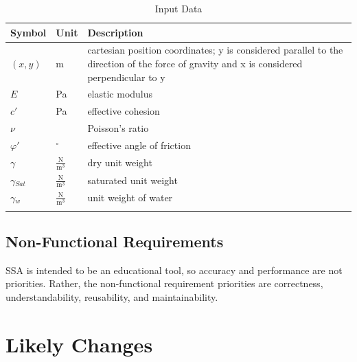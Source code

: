 \documentclass[12pt]{article}
\begin{document}
\begin{longtable}{l l l}
\toprule
Symbol & Unit & Description
\\
\midrule
$(x,y)$ & m & cartesian position coordinates; y is considered parallel to the direction of the force of gravity and x is considered perpendicular to y
\\
$E$ & Pa & elastic modulus
\\
$c'$ & Pa & effective cohesion
\\
$\nu{}$ &  & Poisson's ratio
\\
$\varphi{}'$ & ${}^{\circ}$ & effective angle of friction
\\
$\gamma{}$ & $\frac{\text{N}}{\text{m}^{3}}$ & dry unit weight
\\
$\gamma{}_{Sat}$ & $\frac{\text{N}}{\text{m}^{3}}$ & saturated unit weight
\\
$\gamma{}_{w}$ & $\frac{\text{N}}{\text{m}^{3}}$ & unit weight of water
\\
\bottomrule
\caption{Input Data}
\label{Table:InpuData}
\end{longtable}
\subsection{Non-Functional Requirements}
\label{Sec:Non-Requ}
SSA is intended to be an educational tool, so accuracy and performance are not priorities. Rather, the non-functional requirement priorities are correctness, understandability, reusability, and maintainability.
\section{Likely Changes}
\label{Sec:LikeChan}
\end{document}
